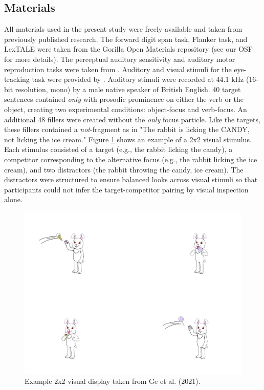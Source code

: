\subsection{Materials}
All materials used in the present study were freely available and taken from previously published research. The forward digit span task, Flanker task, and LexTALE \citep{lemhofer2012introducing} were taken from the Gorilla \citep{Anwyl-Irvine_2019} Open Materials repository (see our OSF for more details). The perceptual auditory sensitivity and auditory motor reproduction tasks were taken from \cite{Kachlicka_Saito_Tierney_2019, saito2020domain}. Auditory and visual stimuli for the eye-tracking task were provided by \cite{Ge2021}. Auditory stimuli were recorded at 44.1 kHz (16-bit resolution, mono) by a male native speaker of British English. 40 target sentences contained \textit{only} with prosodic prominence on either the verb or the object, creating two experimental conditions: object-focus and verb-focus. An additional 48 fillers were created without the \textit{only} focus particle. Like the targets, these fillers contained a \textit{not}-fragment as in "The rabbit is licking the CANDY, not licking the ice cream." Figure \ref{fig:sampleslide} shows an example of a 2x2 visual stimulus. Each stimulus consisted of a target (e.g., the rabbit licking the candy), a competitor corresponding to the alternative focus (e.g., the rabbit licking the ice cream), and two distractors (the rabbit throwing the candy, ice cream). The distractors were structured to ensure balanced looks across visual stimuli so that participants could not infer the target-competitor pairing by visual inspection alone.

\begin{figure}
    \centering
    \includegraphics[width=\textwidth,height=\textheight,keepaspectratio]{viz/Fig1-Geetal.jpg}
    \caption{Example 2x2 visual display taken from Ge et al. (2021).}
    \label{fig:sampleslide}
\end{figure}



